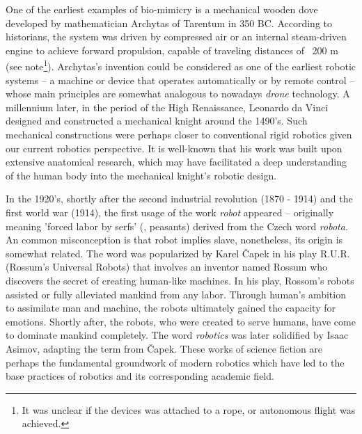 One of the earliest examples of bio-mimicry is a mechanical wooden dove developed by mathematician Archytas of Tarentum in 350 BC. According to historians, the system was driven by compressed air or an internal steam-driven engine to achieve forward propulsion, capable of traveling distances of ~200 \si{\meter} (see note\footnote{It was unclear if the devices was attached to a rope, or autonomous flight was achieved.}). Archytas's invention could be considered as one of the earliest robotic systems -- a machine or device that operates automatically or by remote control -- whose main principles are somewhat analogous to nowadays \emph{drone} technology.  A millennium later, in the period of the High Renaissance, Leonardo da Vinci designed and constructed a mechanical knight around the 1490's. Such mechanical constructions were perhaps closer to conventional rigid robotics given our current robotics perspective. It is well-known that his work was built upon extensive anatomical research, which may have facilitated a deep understanding of the human body into the mechanical knight's robotic design.

\par In the 1920's, shortly after the second industrial revolution (1870 - 1914) and the first world war (1914), the first usage of the work \emph{robot} appeared -- originally meaning 'forced labor by serfs' (\ie, peasants) derived from the Czech word \emph{robota}. An common misconception is that robot implies slave, nonetheless, its origin is somewhat related. The word was popularized by Karel \v{C}apek in his play R.U.R. (Rossum’s Universal Robots) that involves an inventor named Rossum who discovers the secret of creating human-like machines. In his play, Rossom's robots assisted or fully alleviated mankind from any labor. Through human's ambition to assimilate man and machine, the robots ultimately gained the capacity for emotions. Shortly after, the robots, who were created to serve humans, have come to dominate mankind completely. The word \emph{robotics} was later solidified by Isaac Asimov, adapting the term from \v{C}apek. These works of science fiction are perhaps the fundamental groundwork of modern robotics which have led to the base practices of robotics and its corresponding academic field.

